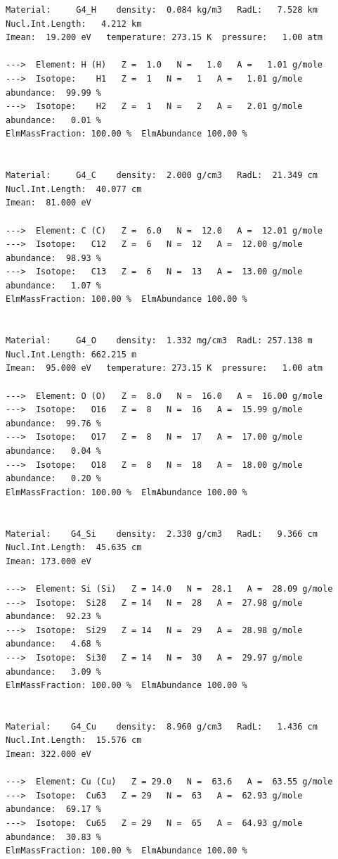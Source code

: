 {\begin{verbatim}
Material:     G4_H    density:  0.084 kg/m3   RadL:   7.528 km   Nucl.Int.Length:   4.212 km 
Imean:  19.200 eV   temperature: 273.15 K  pressure:   1.00 atm

--->  Element: H (H)   Z =  1.0   N =   1.0   A =   1.01 g/mole
--->  Isotope:    H1   Z =  1   N =   1   A =   1.01 g/mole   abundance:  99.99 %
--->  Isotope:    H2   Z =  1   N =   2   A =   2.01 g/mole   abundance:   0.01 %
ElmMassFraction: 100.00 %  ElmAbundance 100.00 % 


Material:     G4_C    density:  2.000 g/cm3   RadL:  21.349 cm   Nucl.Int.Length:  40.077 cm 
Imean:  81.000 eV 

--->  Element: C (C)   Z =  6.0   N =  12.0   A =  12.01 g/mole
--->  Isotope:   C12   Z =  6   N =  12   A =  12.00 g/mole   abundance:  98.93 %
--->  Isotope:   C13   Z =  6   N =  13   A =  13.00 g/mole   abundance:   1.07 %
ElmMassFraction: 100.00 %  ElmAbundance 100.00 % 


Material:     G4_O    density:  1.332 mg/cm3  RadL: 257.138 m    Nucl.Int.Length: 662.215 m  
Imean:  95.000 eV   temperature: 273.15 K  pressure:   1.00 atm

--->  Element: O (O)   Z =  8.0   N =  16.0   A =  16.00 g/mole
--->  Isotope:   O16   Z =  8   N =  16   A =  15.99 g/mole   abundance:  99.76 %
--->  Isotope:   O17   Z =  8   N =  17   A =  17.00 g/mole   abundance:   0.04 %
--->  Isotope:   O18   Z =  8   N =  18   A =  18.00 g/mole   abundance:   0.20 %
ElmMassFraction: 100.00 %  ElmAbundance 100.00 % 


Material:    G4_Si    density:  2.330 g/cm3   RadL:   9.366 cm   Nucl.Int.Length:  45.635 cm 
Imean: 173.000 eV 

--->  Element: Si (Si)   Z = 14.0   N =  28.1   A =  28.09 g/mole
--->  Isotope:  Si28   Z = 14   N =  28   A =  27.98 g/mole   abundance:  92.23 %
--->  Isotope:  Si29   Z = 14   N =  29   A =  28.98 g/mole   abundance:   4.68 %
--->  Isotope:  Si30   Z = 14   N =  30   A =  29.97 g/mole   abundance:   3.09 %
ElmMassFraction: 100.00 %  ElmAbundance 100.00 % 


Material:    G4_Cu    density:  8.960 g/cm3   RadL:   1.436 cm   Nucl.Int.Length:  15.576 cm 
Imean: 322.000 eV 

--->  Element: Cu (Cu)   Z = 29.0   N =  63.6   A =  63.55 g/mole
--->  Isotope:  Cu63   Z = 29   N =  63   A =  62.93 g/mole   abundance:  69.17 %
--->  Isotope:  Cu65   Z = 29   N =  65   A =  64.93 g/mole   abundance:  30.83 %
ElmMassFraction: 100.00 %  ElmAbundance 100.00 % 



\end{verbatim}}
